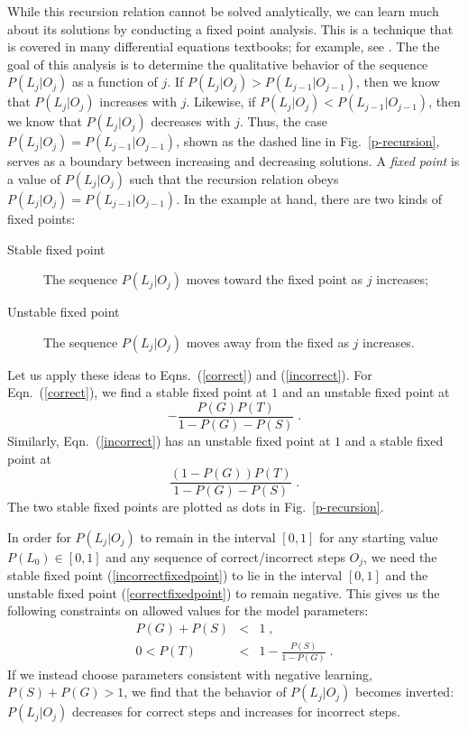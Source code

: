 \documentclass{acmlarge-edm}
\begin{document}
While this recursion relation cannot be solved analytically, we can learn
much about its solutions by conducting a fixed point analysis. 
This is a technique that is covered in many differential equations textbooks; for
example, see \cite{blanchard_differential_2006}.  The the goal of this 
analysis is to determine the qualitative behavior of the sequence $P(L_j|O_j)$ as a
function of $j$.  If $P(L_j|O_j)>P(L_{j-1}|O_{j-1})$, then we know that $P(L_j|O_j)$
increases with $j$.  Likewise, if $P(L_j|O_j)<P(L_{j-1}|O_{j-1})$,
then we know that $P(L_j|O_j)$ decreases with $j$.  Thus, the case
$P(L_j|O_j)=P(L_{j-1}|O_{j-1})$, shown as the dashed line in Fig.~\ref{p-recursion}, 
serves as a boundary between increasing and decreasing solutions.
A {\em fixed point} is a value of $P(L_j|O_j)$ such that the recursion
relation obeys $P(L_j|O_j)=P(L_{j-1}|O_{j-1})$.  In the example at
hand, there are two kinds of fixed points:
\begin{description}
  \item[Stable fixed point] The sequence $P(L_j|O_j)$ moves toward the fixed point
    as $j$ increases;
  \item[Unstable fixed point] The sequence $P(L_j|O_j)$ moves away from the fixed as $j$ increases.
\end{description}

Let us apply these ideas to Eqns.~(\ref{correct}) and (\ref{incorrect}).
For Eqn.~(\ref{correct}), we find a stable fixed point at $1$ and 
an unstable fixed point at
%
\begin{equation}
    - \frac{P(G) P(T)}{1-P(G)-P(S)} \; .
      \label{correctfixedpoint}
\end{equation}
%
Similarly, Eqn.~(\ref{incorrect}) has an unstable fixed point at $1$
and a stable fixed point at
%
\begin{equation}
    \frac{\left(1-P(G)\right) P(T)}{1-P(G)-P(S)} \; . 
       \label{incorrectfixedpoint}
\end{equation}
%
The two stable fixed points are plotted as dots in Fig.~\ref{p-recursion}.


In order for $P(L_j|O_j)$ to remain in the interval $\left[0,1\right]$ 
for any starting value $P(L_0)\in \left[0,1\right]$ and any sequence of 
correct/incorrect steps $O_j$, 
we need the stable fixed point (\ref{incorrectfixedpoint})
to lie in the interval $\left[0,1\right]$ and the unstable fixed point 
(\ref{correctfixedpoint}) to remain negative.  This gives us the following
constraints on allowed values for the model parameters:
%
\begin{eqnarray}
        P(G)+P(S)&<& 1 \;, \label{littleconstraint}\\
        0 < P(T) &<& 1-\frac{P(S)}{1-P(G)}  \; .
        \label{bigconstraint}
\end{eqnarray}
%
If we instead choose parameters consistent with negative learning,
$P(S)+P(G)>1$, we find that the behavior of $P(L_j|O_j)$ becomes inverted: 
$P(L_j|O_j)$ decreases for correct steps and increases for incorrect steps.
\end{document}
